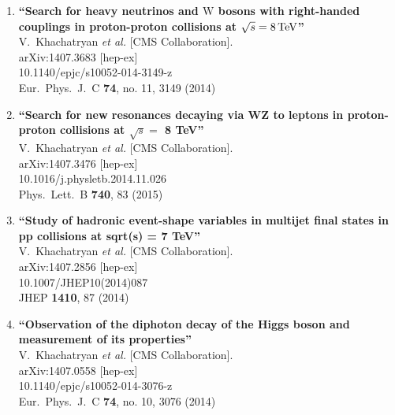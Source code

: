 \documentclass{article}
\begin{document}
\begin{enumerate}
\item%
{\bf ``Search for heavy neutrinos and $\mathrm {W}$ bosons with right-handed couplings in proton-proton collisions at $\sqrt{s} = 8\,\rm  {TeV} $''}
  \\{}V.~Khachatryan {\it et al.}  [CMS Collaboration].
  \\{}arXiv:1407.3683 [hep-ex]
    \\{}10.1140/epjc/s10052-014-3149-z
\\{}Eur.\ Phys.\ J.\ C {\bf 74}, no. 11, 3149 (2014) %


\item%
{\bf ``Search for new resonances decaying via WZ to leptons in proton-proton collisions at $\sqrt s =$ 8 TeV''}
  \\{}V.~Khachatryan {\it et al.}  [CMS Collaboration].
  \\{}arXiv:1407.3476 [hep-ex]
    \\{}10.1016/j.physletb.2014.11.026
\\{}Phys.\ Lett.\ B {\bf 740}, 83 (2015) %


\item%
{\bf ``Study of hadronic event-shape variables in multijet final states in pp collisions at sqrt(s) = 7 TeV''}
  \\{}V.~Khachatryan {\it et al.}  [CMS Collaboration].
  \\{}arXiv:1407.2856 [hep-ex]
    \\{}10.1007/JHEP10(2014)087
\\{}JHEP {\bf 1410}, 87 (2014) %


\item%
{\bf ``Observation of the diphoton decay of the Higgs boson and measurement of its properties''}
  \\{}V.~Khachatryan {\it et al.}  [CMS Collaboration].
  \\{}arXiv:1407.0558 [hep-ex]
    \\{}10.1140/epjc/s10052-014-3076-z
\\{}Eur.\ Phys.\ J.\ C {\bf 74}, no. 10, 3076 (2014) %



\end{enumerate}
\end{document}
